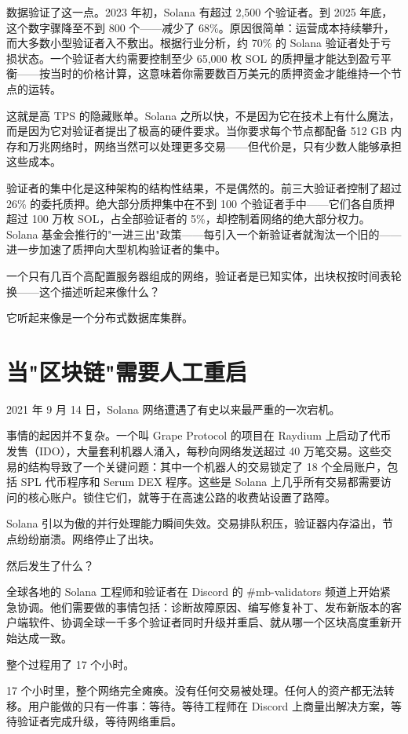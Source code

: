 \documentclass[a4paper,12pt,openany]{ctexbook}
\begin{document}
数据验证了这一点。2023 年初，Solana 有超过 2,500 个验证者。到 2025 年底，这个数字骤降至不到 800 个——减少了 68\%。原因很简单：运营成本持续攀升，而大多数小型验证者入不敷出。根据行业分析，约 70\% 的 Solana 验证者处于亏损状态。一个验证者大约需要控制至少 65,000 枚 SOL 的质押量才能达到盈亏平衡——按当时的价格计算，这意味着你需要数百万美元的质押资金才能维持一个节点的运转。

这就是高 TPS 的隐藏账单。Solana 之所以快，不是因为它在技术上有什么魔法，而是因为它对验证者提出了极高的硬件要求。当你要求每个节点都配备 512 GB 内存和万兆网络时，网络当然可以处理更多交易——但代价是，只有少数人能够承担这些成本。

验证者的集中化是这种架构的结构性结果，不是偶然的。前三大验证者控制了超过 26\% 的委托质押。绝大部分质押集中在不到 100 个验证者手中——它们各自质押超过 100 万枚 SOL，占全部验证者的 5\%，却控制着网络的绝大部分权力。Solana 基金会推行的"一进三出"政策——每引入一个新验证者就淘汰一个旧的——进一步加速了质押向大型机构验证者的集中。

一个只有几百个高配置服务器组成的网络，验证者是已知实体，出块权按时间表轮换——这个描述听起来像什么？

它听起来像是一个分布式数据库集群。


\section*{当"区块链"需要人工重启}


2021 年 9 月 14 日，Solana 网络遭遇了有史以来最严重的一次宕机。

事情的起因并不复杂。一个叫 Grape Protocol 的项目在 Raydium 上启动了代币发售（IDO），大量套利机器人涌入，每秒向网络发送超过 40 万笔交易。这些交易的结构导致了一个关键问题：其中一个机器人的交易锁定了 18 个全局账户，包括 SPL 代币程序和 Serum DEX 程序。这些是 Solana 上几乎所有交易都需要访问的核心账户。锁住它们，就等于在高速公路的收费站设置了路障。

Solana 引以为傲的并行处理能力瞬间失效。交易排队积压，验证器内存溢出，节点纷纷崩溃。网络停止了出块。

然后发生了什么？

全球各地的 Solana 工程师和验证者在 Discord 的 \#mb-validators 频道上开始紧急协调。他们需要做的事情包括：诊断故障原因、编写修复补丁、发布新版本的客户端软件、协调全球一千多个验证者同时升级并重启、就从哪一个区块高度重新开始达成一致。

整个过程用了 17 个小时。

17 个小时里，整个网络完全瘫痪。没有任何交易被处理。任何人的资产都无法转移。用户能做的只有一件事：等待。等待工程师在 Discord 上商量出解决方案，等待验证者完成升级，等待网络重启。
\end{document}
